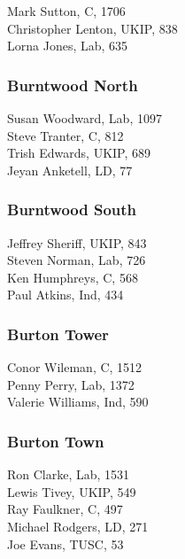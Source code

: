 \documentclass[a4paper,openany,10pt]{book}
\begin{document}


Mark Sutton, C, 1706\\
Christopher Lenton, UKIP, 838\\
Lorna Jones, Lab, 635\\


\subsubsection*{Burntwood North}



Susan Woodward, Lab, 1097\\
Steve Tranter, C, 812\\
Trish Edwards, UKIP, 689\\
Jeyan Anketell, LD, 77\\


\subsubsection*{Burntwood South}



Jeffrey Sheriff, UKIP, 843\\
Steven Norman, Lab, 726\\
Ken Humphreys, C, 568\\
Paul Atkins, Ind, 434\\


\subsubsection*{Burton Tower}



Conor Wileman, C, 1512\\
Penny Perry, Lab, 1372\\
Valerie Williams, Ind, 590\\


\subsubsection*{Burton Town}



Ron Clarke, Lab, 1531\\
Lewis Tivey, UKIP, 549\\
Ray Faulkner, C, 497\\
Michael Rodgers, LD, 271\\
Joe Evans, TUSC, 53\\
\end{document}

